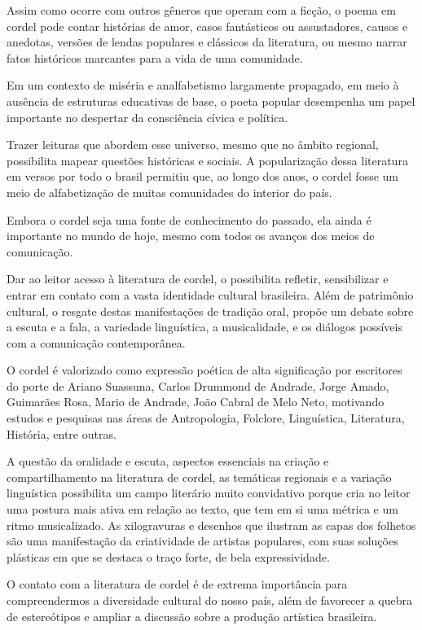 \documentclass[12pt]{extarticle}
\begin{document}
Assim como ocorre com outros gêneros que operam com a ficção, o poema em
cordel pode contar histórias de amor, casos fantásticos ou assustadores,
causos e anedotas, versões de lendas populares e clássicos da
literatura, ou mesmo narrar fatos históricos marcantes para a vida de
uma comunidade.

Em um contexto de miséria e analfabetismo largamente propagado, em meio
à ausência de estruturas educativas de base, o poeta popular desempenha
um papel importante no despertar da consciência cívica e política.

Trazer leituras que abordem esse universo, mesmo que no âmbito regional,
possibilita mapear questões históricas e sociais. A popularização dessa
literatura em versos por todo o brasil permitiu que, ao longo dos anos,
o cordel fosse um meio de alfabetização de muitas comunidades do
interior do país.

Embora o cordel seja uma fonte de conhecimento do passado, ela ainda é
importante no mundo de hoje, mesmo com todos os avanços dos meios de
comunicação.

Dar ao leitor acesso à literatura de cordel, o possibilita refletir,
sensibilizar e entrar em contato com a vasta identidade cultural
brasileira. Além de patrimônio cultural, o resgate destas manifestações
de tradição oral, propõe um debate sobre a escuta e a fala, a variedade
linguística, a musicalidade, e os diálogos possíveis com a comunicação
contemporânea.

O cordel é valorizado como expressão poética de alta significação por
escritores do porte de Ariano Suassuna, Carlos Drummond de Andrade,
Jorge Amado, Guimarães Rosa, Mario de Andrade, João Cabral de Melo Neto,
motivando estudos e pesquisas nas áreas de Antropologia, Folclore,
Linguística, Literatura, História, entre outras.

A questão da oralidade e escuta, aspectos essenciais na criação e
compartilhamento na literatura de cordel, as temáticas regionais e a
variação linguística possibilita um campo literário muito convidativo
porque cria no leitor uma postura mais ativa em relação ao texto, que
tem em si uma métrica e um ritmo musicalizado. As xilogravuras e
desenhos que ilustram as capas dos folhetos são uma manifestação da
criatividade de artistas populares, com suas soluções plásticas em que
se destaca o traço forte, de bela expressividade.

O contato com a literatura de cordel é de extrema importância para
compreendermos a diversidade cultural do nosso país, além de favorecer a
quebra de estereótipos e ampliar a discussão sobre a produção artística
brasileira.
\end{document}
